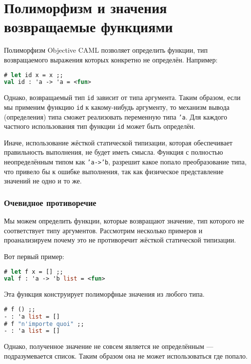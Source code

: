 \section{Полиморфизм и значения возвращаемые функциями}

Полиморфизм Objective CAML позволяет определить функции, тип возвращаемого
выражения которых конкретно не определён. Например:

\begin{lstlisting}[language=OCaml]
# let id x = x ;;
val id : 'a -> 'a = <fun>
\end{lstlisting}

Однако, возвращаемый тип \texttt{id} зависит от типа аргумента. Таким образом,
если мы применим функцию \texttt{id} к какому-нибудь аргументу, то механизм
вывода (определения) типа сможет реализовать переменную типа \texttt{'a}. Для
каждого частного использования тип функции \texttt{id} может быть определён.

Иначе, использование жёсткой статической типизации, которая обеспечивает
правильность выполнения, не будет иметь смысла. Функция с полностью
неопределённым типом как \texttt{'a->'b}, разрешит какое попало преобразование
типа, что привело бы к ошибке выполнения, так как физическое представление
значений не одно и то же.

\subsubsection{Очевидное противоречие}

Мы можем определить функции, которые возвращают значение, тип которого не
соответствует типу аргументов. Рассмотрим несколько примеров и проанализируем
почему это не противоречит жёсткой статической типизации.

Вот первый пример:

\begin{lstlisting}[language=OCaml]
# let f x = [] ;;
val f : 'a -> 'b list = <fun>
\end{lstlisting}

Эта функция конструирует полиморфные значения из любого типа.

\begin{lstlisting}[language=OCaml]
# f () ;;
- : 'a list = []
# f "n'importe quoi" ;;
- : 'a list = []
\end{lstlisting}

Однако, полученное значение не совсем является не определённым ---
подразумевается список. Таким образом она не может использоваться где попало.


